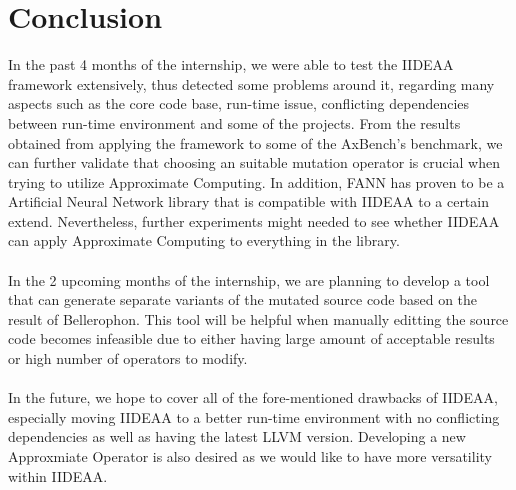 \chapter{Conclusion}

In the past 4 months of the internship, we were able to test the IIDEAA framework extensively, thus detected some problems around it, regarding many aspects such as the core code base, run-time issue, conflicting dependencies between run-time environment and some of the projects. From the results obtained from applying the framework to some of the AxBench's benchmark, we can further validate that choosing an suitable mutation operator is crucial when trying to utilize Approximate Computing. In addition, FANN has proven to be a Artificial Neural Network library that is compatible with IIDEAA to a certain extend. Nevertheless, further experiments might needed to see whether IIDEAA can apply Approximate Computing to everything in the library. \\
~\\
In the 2 upcoming months of the internship, we are planning to develop a tool that can generate separate variants of the mutated source code based on the result of Bellerophon. This tool will be helpful when manually editting the source code becomes infeasible due to either having large amount of acceptable results or high number of operators to modify. \\
~\\
In the future, we hope to cover all of the fore-mentioned drawbacks of IIDEAA, especially moving IIDEAA to a better run-time environment with no conflicting dependencies as well as having the latest LLVM version. Developing a new Approxmiate Operator is also desired as we would like to have more versatility within IIDEAA.\\